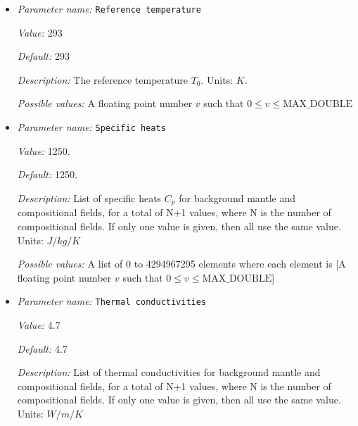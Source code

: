 \begin{itemize}
{\it Default:} 1.e3


{\it Description:} The fixed elastic time step $dte$. Units: years if the 'Use years in output instead of seconds' parameter is set; seconds otherwise.


{\it Possible values:} A floating point number $v$ such that $0 \leq v \leq \text{MAX\_DOUBLE}$
\item {\it Parameter name:} {\tt Reference temperature}
\label{parameters:Material model/Viscoelastic/Reference temperature}
\label{parameters:Material_20model/Viscoelastic/Reference_20temperature}


{\it Value:} 293


{\it Default:} 293


{\it Description:} The reference temperature $T_0$. Units: $K$.


{\it Possible values:} A floating point number $v$ such that $0 \leq v \leq \text{MAX\_DOUBLE}$
\item {\it Parameter name:} {\tt Specific heats}
\label{parameters:Material model/Viscoelastic/Specific heats}
\label{parameters:Material_20model/Viscoelastic/Specific_20heats}


{\it Value:} 1250.


{\it Default:} 1250.


{\it Description:} List of specific heats $C_p$ for background mantle and compositional fields, for a total of N+1 values, where N is the number of compositional fields. If only one value is given, then all use the same value. Units: $J /kg /K$


{\it Possible values:} A list of 0 to 4294967295 elements where each element is [A floating point number $v$ such that $0 \leq v \leq \text{MAX\_DOUBLE}$]
\item {\it Parameter name:} {\tt Thermal conductivities}
\label{parameters:Material model/Viscoelastic/Thermal conductivities}
\label{parameters:Material_20model/Viscoelastic/Thermal_20conductivities}


{\it Value:} 4.7


{\it Default:} 4.7


{\it Description:} List of thermal conductivities for background mantle and compositional fields, for a total of N+1 values, where N is the number of compositional fields. If only one value is given, then all use the same value. Units: $W/m/K$ 



\end{itemize}
